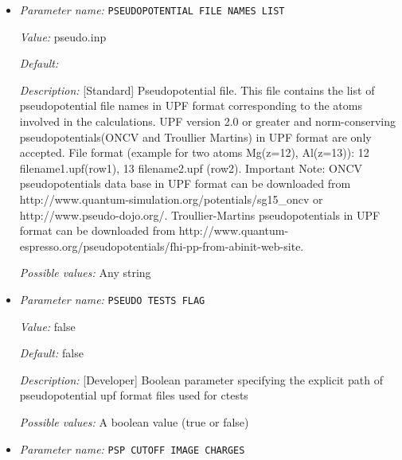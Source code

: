 \begin{itemize}
{\it Value:} true


{\it Default:} true


{\it Description:} [Standard] Boolean Parameter specifying whether pseudopotential DFT calculation needs to be performed. For all-electron DFT calculation set to false.


{\it Possible values:} A boolean value (true or false)
\item {\it Parameter name:} {\tt PSEUDOPOTENTIAL FILE NAMES LIST}
\label{parameters:DFT functional parameters/PSEUDOPOTENTIAL FILE NAMES LIST}
\label{parameters:DFT_20functional_20parameters/PSEUDOPOTENTIAL_20FILE_20NAMES_20LIST}


{\it Value:} pseudo.inp


{\it Default:} 


{\it Description:} [Standard] Pseudopotential file. This file contains the list of pseudopotential file names in UPF format corresponding to the atoms involved in the calculations. UPF version 2.0 or greater and norm-conserving pseudopotentials(ONCV and Troullier Martins) in UPF format are only accepted. File format (example for two atoms Mg(z=12), Al(z=13)): 12 filename1.upf(row1), 13 filename2.upf (row2). Important Note: ONCV pseudopotentials data base in UPF format can be downloaded from http://www.quantum-simulation.org/potentials/sg15\_oncv or http://www.pseudo-dojo.org/.  Troullier-Martins pseudopotentials in UPF format can be downloaded from http://www.quantum-espresso.org/pseudopotentials/fhi-pp-from-abinit-web-site.


{\it Possible values:} Any string
\item {\it Parameter name:} {\tt PSEUDO TESTS FLAG}
\label{parameters:DFT functional parameters/PSEUDO TESTS FLAG}
\label{parameters:DFT_20functional_20parameters/PSEUDO_20TESTS_20FLAG}


{\it Value:} false


{\it Default:} false


{\it Description:} [Developer] Boolean parameter specifying the explicit path of pseudopotential upf format files used for ctests


{\it Possible values:} A boolean value (true or false)
\item {\it Parameter name:} {\tt PSP CUTOFF IMAGE CHARGES}
\label{parameters:DFT functional parameters/PSP CUTOFF IMAGE CHARGES}
\label{parameters:DFT_20functional_20parameters/PSP_20CUTOFF_20IMAGE_20CHARGES}



\end{itemize}
